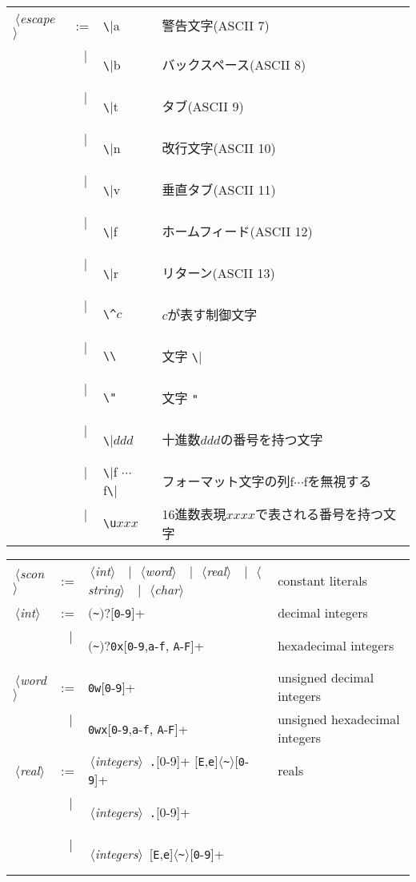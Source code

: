 \documentclass{jbook}
\newcommand{\vbar}{\mbox{\ $|$\ }}
\newcommand{\nonterm}[1]{\mbox{$\,\langle$}{\it #1}\mbox{$\rangle\,$}}
\newcommand{\term}[1]{\mbox{{\tt #1}}}
\newcommand{\optionalBegin}{\mbox{$($}}
\newcommand{\optionalEnd}{\mbox{$)?$}}
\begin{document}
\begin{description}
\begin{center}
\begin{tabular}{lcll}
\nonterm{escape} &:=& \verb|\|a & 警告文字(ASCII 7)\\
&\vbar&\verb|\|b & バックスペース(ASCII 8)\\
&\vbar&\verb|\|t & タブ(ASCII 9)\\
&\vbar&\verb|\|n & 改行文字(ASCII 10)\\
&\vbar&\verb|\|v & 垂直タブ(ASCII 11)\\
&\vbar&\verb|\|f & ホームフィード(ASCII 12)\\
&\vbar&\verb|\|r & リターン(ASCII 13)\\
&\vbar&\verb|\^|$c$ & $c$が表す制御文字\\
&\vbar&\verb|\\| & 文字 \verb|\|\\
&\vbar&\verb|\"| & 文字 \verb|"|\\   %
&\vbar&\verb|\|$ddd$ &十進数$ddd$の番号を持つ文字\\
&\vbar&\verb|\|f 
$\cdots$ f\verb|\|& フォーマット文字の列f$\cdots$fを無視する
\\
&\vbar&\verb|\u|$xxx$&
16進数表現$xxxx$で表される番号を持つ文字
\\
\end{tabular}
\end{center}
\else%
\begin{center}
\begin{tabular}{lcll}
\nonterm{scon} &:=& 
\nonterm{int} 
\vbar \nonterm{word} 
\vbar \nonterm{real} 
\vbar \nonterm{string} 
\vbar \nonterm{char}
&constant literals\\
\nonterm{int} &:=& 
\optionalBegin\verb|~|\optionalEnd[\term{0}-\term{9}]+ & decimal integers\\
&\vbar& \optionalBegin\verb|~|\optionalEnd\verb|0x|[\term{0}-\term{9},\term{a}-\term{f},%
\term{A}-\term{F}]+& hexadecimal integers
\\[0.5ex]
\nonterm{word} &:=& \verb|0w|[\term{0}-\term{9}]+&
unsigned decimal integers
\\
&\vbar&\verb|0wx|[\term{0}-\term{9},\term{a}-\term{f},%
\term{A}-\term{F}]+& 
unsigned hexadecimal integers
\\[0.5ex]
\nonterm{real}&:=& 
\nonterm{integers} \term{.}[0-9]+
[\term{E},\term{e}]$\langle$\verb|~|$\rangle$[\term{0}-\term{9}]+
&reals\\
&\vbar&\nonterm{integers} \term{.}[0-9]+ 
&\\
&\vbar&\nonterm{integers} 
[\term{E},\term{e}]$\langle$\verb|~|$\rangle$[\term{0}-\term{9}]+

\end{tabular}
\end{center}
\end{description}
\end{document}
